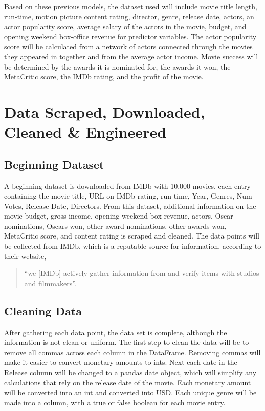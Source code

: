 \documentclass{article}
\begin{document}
Based on these previous models, the dataset used will include movie
title length, run-time, motion picture content rating, director, genre,
release date, actors, an actor popularity score, average salary of the
actors in the movie, budget, and opening weekend box-office revenue for
predictor variables. The actor popularity score will be calculated from
a network of actors connected through the movies they appeared in
together and from the average actor income. Movie success will be
determined by the awards it is nominated for, the awards it won, the
MetaCritic score, the IMDb rating, and the profit of the movie.

\hypertarget{data-scraped-downloaded-cleaned-engineered}{%
	\section{Data Scraped, Downloaded, Cleaned \&
		Engineered}\label{data-scraped-downloaded-cleaned-engineered}}

\hypertarget{beginning-dataset}{%
	\subsection{Beginning Dataset}\label{beginning-dataset}}

A beginning dataset is downloaded from IMDb with 10,000 movies, each
entry containing the movie title, URL on IMDb rating, run-time, Year,
Genres, Num Votes, Release Date, Directors. From this dataset,
additional information on the movie budget, gross income, opening
weekend box revenue, actors, Oscar nominations, Oscars won, other award
nominations, other awards won, MetaCritic score, and content rating is
scraped and cleaned. The data points will be collected from IMDb, which
is a reputable source for information, according to their website,

\begin{quote}
	``we {[}IMDb{]} actively gather information from and verify items with
	studios and filmmakers''.
\end{quote}

\hypertarget{cleaning-data}{%
	\subsection{Cleaning Data}\label{cleaning-data}}

After gathering each data point, the data set is complete, although the
information is not clean or uniform. The first step to clean the data
will be to remove all commas across each column in the DataFrame.
Removing commas will make it easier to convert monetary amounts to ints.
Next each date in the Release column will be changed to a pandas date
object, which will simplify any calculations that rely on the release
date of the movie. Each monetary amount will be converted into an int
and converted into USD. Each unique genre will be made into a column,
with a true or false boolean for each movie entry.
\end{document}

